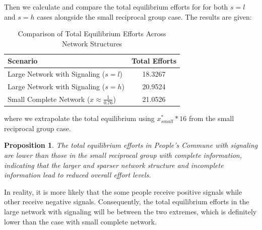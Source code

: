 \documentclass[12pt]{article}
\newtheorem{proposition}{Proposition}
\begin{document}
    Then we calculate and compare the total equilibrium efforts for for both $s=l$ and $s=h$ cases alongside the small reciprocal group case. The results are given:
\begin{table}[H]
  \centering
  \caption{Comparison of Total Equilibrium Efforts Across Network Structures}
  \begin{tabular}{l c}
  \toprule
  \textbf{Scenario} & \textbf{Total Efforts} \\
  \midrule
  Large Network with Signaling (\( s = l \)) & 18.3267 \\
  Large Network with Signaling (\( s = h \)) & 20.9524 \\
  Small Complete Network (\( x \approx \frac{1}{0.76} \)) & 21.0526 \\
  \bottomrule
  \end{tabular}
  \end{table}
  where we extrapolate the total equilibrium using $x^*_{small} * 16$ from the small reciprocal group case.\\ 
\begin{proposition}
  The total equilibrium efforts in People's Commune with signaling are lower than those in the small reciprocal group with complete information, indicating that the larger and sparser network structure and incomplete information lead to reduced overall effort levels.
\end{proposition}
In reality, it is more likely that the some people receive positive signals while other receive negative signals. Consequently, the total equilibrium efforts in the large network with signaling will be between the two extremes, which is definitely lower than the case with small complete network.\\
\end{document}
